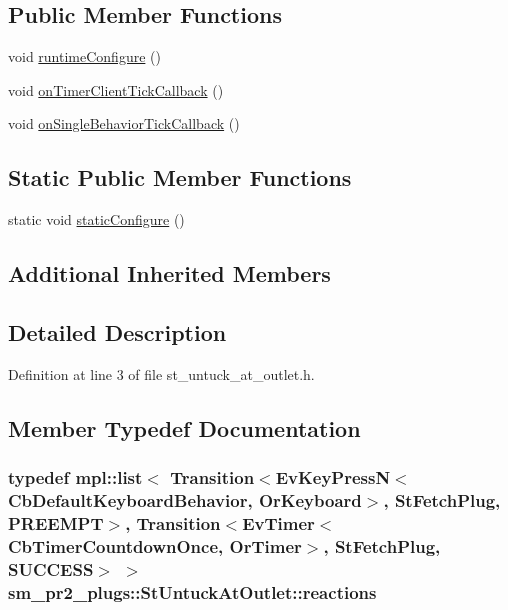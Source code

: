 \subsection*{Public Member Functions}
\begin{DoxyCompactItemize}
\item 
void \hyperlink{structsm__pr2__plugs_1_1StUntuckAtOutlet_a14d6ec782f8d78b6df0ef610508b0e9b}{runtime\+Configure} ()
\item 
void \hyperlink{structsm__pr2__plugs_1_1StUntuckAtOutlet_a51a908bc8b1908d8e548db64bc8a5528}{on\+Timer\+Client\+Tick\+Callback} ()
\item 
void \hyperlink{structsm__pr2__plugs_1_1StUntuckAtOutlet_a6a0c321350c11e8f393c34e7c85bf36a}{on\+Single\+Behavior\+Tick\+Callback} ()
\end{DoxyCompactItemize}
\subsection*{Static Public Member Functions}
\begin{DoxyCompactItemize}
\item 
static void \hyperlink{structsm__pr2__plugs_1_1StUntuckAtOutlet_a7ec4bd71b7f8b5ce3b5229111c9afd2d}{static\+Configure} ()
\end{DoxyCompactItemize}
\subsection*{Additional Inherited Members}


\subsection{Detailed Description}


Definition at line 3 of file st\+\_\+untuck\+\_\+at\+\_\+outlet.\+h.



\subsection{Member Typedef Documentation}
\subsubsection[{\texorpdfstring{reactions}{reactions}}]{\setlength{\rightskip}{0pt plus 5cm}typedef mpl\+::list$<$ Transition$<$Ev\+Key\+PressN$<$Cb\+Default\+Keyboard\+Behavior, {\bf Or\+Keyboard}$>$, {\bf St\+Fetch\+Plug}, {\bf P\+R\+E\+E\+M\+PT}$>$, Transition$<$Ev\+Timer$<$Cb\+Timer\+Countdown\+Once, {\bf Or\+Timer}$>$, {\bf St\+Fetch\+Plug}, {\bf S\+U\+C\+C\+E\+SS}$>$ $>$ {\bf sm\+\_\+pr2\+\_\+plugs\+::\+St\+Untuck\+At\+Outlet\+::reactions}}\hypertarget{structsm__pr2__plugs_1_1StUntuckAtOutlet_a77b0bad04ff5db4fc1a9b8557a435211}{}\label{structsm__pr2__plugs_1_1StUntuckAtOutlet_a77b0bad04ff5db4fc1a9b8557a435211}



